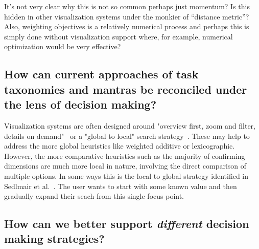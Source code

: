 
It's not very clear why this is not so common perhaps just momentum? Is
this hidden in other visualization systems under the monkier of
``distance metric''? Also, weighting objectives is a relatively
numerical process and perhaps this is simply done without visualization
support where, for example, numerical optimization would be very
effective?



\subsection{How can current approaches of task taxonomies and mantras be reconciled under the lens of decision making?}

Visualization systems are often designed around 
"overview first, zoom and filter, details on demand"~\cite{Shneiderman:1996} or
a "global to local" search strategy~\cite{Sedlmair:2014}. These may help to
address the more global heuristics like weighted additive or lexicographic.
However, the more comparative heuristics such as the majority of confirming 
dimensions are much more local in nature, involving the direct comparison
of multiple options.  In some ways this is the local to global
strategy identified in Sedlmair et al.~\citep{Sedlmair:2014}. The user wants
to start with some known value and then gradually expand their seach from
this single focus point.



\subsection{How can we better support \emph{different} decision making strategies?}

